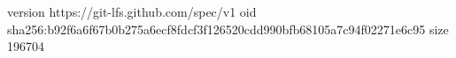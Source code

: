 version https://git-lfs.github.com/spec/v1
oid sha256:b92f6a6f67b0b275a6ecf8fdcf3f126520cdd990bfb68105a7c94f02271e6c95
size 196704
